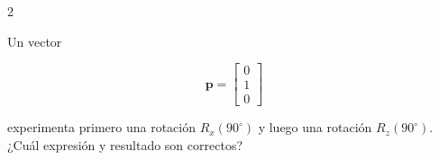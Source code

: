 \documentclass[10pt]{article}
\begin{document}
\begin{multicols}{2}
\begin{question}
            Un vector

            \[
            \mathbf{p}
            =
            \begin{bmatrix}
                0\\
                1\\
                0
            \end{bmatrix}
            \]

            experimenta primero una rotación \(R_x(90^\circ)\) y luego una
            rotación \(R_z(90^\circ)\).
            \columnbreak
            ¿Cuál expresión y resultado son correctos?

            \begin{answers}
                \answer{
                    \[
                    \mathbf{p}'
                    =
                    R_x(90^\circ)R_z(90^\circ)\mathbf{p}
                    =
                    \begin{bmatrix}
                        -1\\0\\0
                    \end{bmatrix}
                    \]
                }

                \answer{
                    \[
                    \mathbf{p}'
                    =
                    R_z(90^\circ)R_x(90^\circ)\mathbf{p}
                    =
                    \begin{bmatrix}
                        0\\0\\1
                    \end{bmatrix}
                    \]
                }

                \answer{
                    \[
                    \mathbf{p}'
                    =
                    R_z(90^\circ)R_x(90^\circ)\mathbf{p}
                    =
                    \begin{bmatrix}
                        -1\\0\\0
                    \end{bmatrix}
                    \]
                }

                \answer{
                    \[
                    \mathbf{p}'
                    =
                    R_x(90^\circ)R_z(90^\circ)\mathbf{p}
                    =
                    \begin{bmatrix}
                        0\\0\\1
                    \end{bmatrix}
                    \]
                }
            \end{answers}
        \end{question}


\end{multicols}
\end{document}
